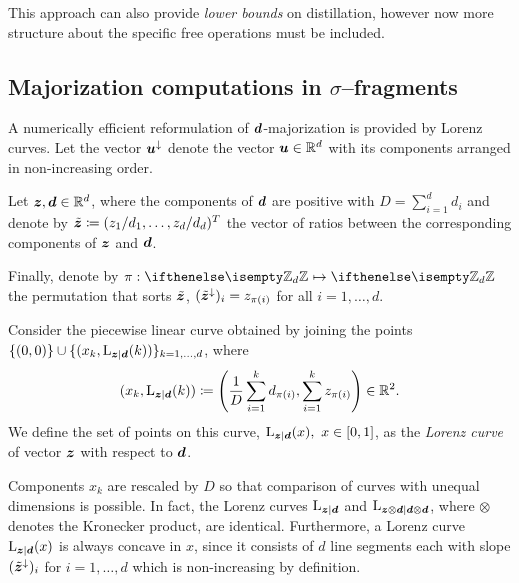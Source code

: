 \documentclass[pra,
aps,
twocolumn,
superscriptaddress,
groupedaddress,
nofootinbib,
reprint
]{revtex4-1}
\begin{document}
This approach can also provide \emph{lower bounds} on distillation, however now more structure about the specific free operations must be included. 

\subsection{Majorization computations in $\sigma$--fragments}
A numerically efficient reformulation of $\bm{d}$-majorization is provided by Lorenz curves.
Let the vector $\bm{u}^\downarrow$ denote the vector $\bm{u} \in \mathbb{R}^d$ with its components arranged in non-increasing order.
\begin{definition}\label{def:lc}
    Let $\bm{z}, \bm{d} \in \mathbb{R}^d$, where the components of $\bm{d}$ are positive with $D = \sum_{i=1}^d d_i$ and denote by $\tilde{\bm{z}} \coloneqq (z_1/d_1, \dots, z_d/d_d)^T$ the vector of ratios between the corresponding components of $\bm{z}$ and $\bm{d}$.
    
    Finally, denote by $\pi: \zd \mapsto \zd$ the permutation that sorts $\tilde{\bm{z}}$, $(\tilde{\bm{z}}^\downarrow)_i = z_{\pi(i)}$ for all $i=1,\dots,d$.
    
    Consider the piecewise linear curve obtained by joining the points $\{(0,0)\} \cup \{ (x_k, {{\rm{L}}_{\bm{z}|\bm{d}}}(k)) \}_{k=1,\dots,d}$, where
    \begin{equation}\label{eq:lorenz}
        (x_k, {{\rm{L}}_{\bm{z}|\bm{d}}}(k)) \coloneqq \left( \frac{1}{D}\sum_{i=1}^k d_{\pi(i)}, \sum_{i=1}^k z_{\pi(i)} \right) \in \mathbb{R}^2.
    \end{equation}
    We define the set of points on this curve, ${{\rm{L}}_{\bm{z}|\bm{d}}}(x),\ x \in [0,1]$, as the \emph{Lorenz curve} of vector $\bm{z}$ with respect to $\bm{d}$.
\end{definition}
Components $x_k$ are rescaled by $D$ so that comparison of curves with unequal dimensions is possible.
In fact, the Lorenz curves ${{\rm{L}}_{\bm{z}|\bm{d}}}$ and ${{\rm{L}}_{\bm{z} \otimes \bm{d}|\bm{d} \otimes \bm{d}}}$, where $\otimes$ denotes the Kronecker product, are identical.
Furthermore, a Lorenz curve ${{\rm{L}}_{\bm{z}|\bm{d}}}(x)$ is always concave in $x$, since it consists of $d$ line segments each with slope $(\tilde{\bm{z}}^\downarrow)_i$ for $i=1,\dots,d$ which is non-increasing by definition.
\end{document}
